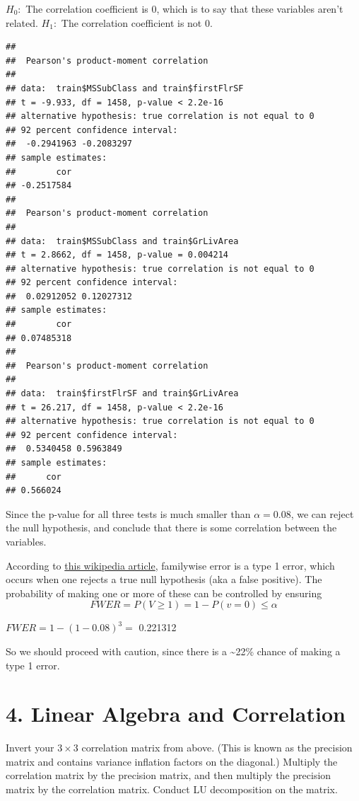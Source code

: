 \documentclass[]{article}
\begin{document}
\(H_0:\) The correlation coefficient is 0, which is to say that these
variables aren't related. \(H_1:\) The correlation coefficient is not 0.

\begin{verbatim}
## 
##  Pearson's product-moment correlation
## 
## data:  train$MSSubClass and train$firstFlrSF
## t = -9.933, df = 1458, p-value < 2.2e-16
## alternative hypothesis: true correlation is not equal to 0
## 92 percent confidence interval:
##  -0.2941963 -0.2083297
## sample estimates:
##        cor 
## -0.2517584
## 
##  Pearson's product-moment correlation
## 
## data:  train$MSSubClass and train$GrLivArea
## t = 2.8662, df = 1458, p-value = 0.004214
## alternative hypothesis: true correlation is not equal to 0
## 92 percent confidence interval:
##  0.02912052 0.12027312
## sample estimates:
##        cor 
## 0.07485318
## 
##  Pearson's product-moment correlation
## 
## data:  train$firstFlrSF and train$GrLivArea
## t = 26.217, df = 1458, p-value < 2.2e-16
## alternative hypothesis: true correlation is not equal to 0
## 92 percent confidence interval:
##  0.5340458 0.5963849
## sample estimates:
##      cor 
## 0.566024
\end{verbatim}

Since the p-value for all three tests is much smaller than
\(\alpha = 0.08\), we can reject the null hypothesis, and conclude that
there is some correlation between the variables.

According to
\href{https://en.wikipedia.org/wiki/Family-wise_error_rate}{this
wikipedia article}, familywise error is a type 1 error, which occurs
when one rejects a true null hypothesis (aka a false positive). The
probability of making one or more of these can be controlled by ensuring
\[
FWER = P(V \geq 1) = 1 - P(v = 0) \leq \alpha
\]

\(FWER = 1-(1-0.08)^3 =\) 0.221312

So we should proceed with caution, since there is a
\textasciitilde{}22\% chance of making a type 1 error.

\hypertarget{linear-algebra-and-correlation}{%
\section{4. Linear Algebra and
Correlation}\label{linear-algebra-and-correlation}}

Invert your \(3 \times 3\) correlation matrix from above. (This is known
as the precision matrix and contains variance inflation factors on the
diagonal.) Multiply the correlation matrix by the precision matrix, and
then multiply the precision matrix by the correlation matrix. Conduct LU
decomposition on the matrix.
\end{document}
